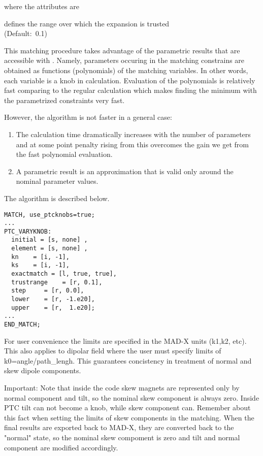 where the attributes are
\begin{madlist}
   defines the range over which the expansion is
  trusted \\ (Default:~0.1)
\end{madlist}

This matching procedure takes advantage of the parametric results that
are accessible with \ptc. Namely, parameters occuring in the matching
constrains are obtained as functions (polynomials) of the matching
variables. In other words, each variable is a knob in \ptc
calculation. Evaluation of the polynomials is relatively fast comparing
to the regular \ptc calculation which makes finding the minimum with the
parametrized constraints very fast.  

However, the algorithm is not faster in a general case: 
\begin{enumerate}
   \item  The calculation time dramatically increases with the number of
     parameters and at some point penalty rising from this overcomes the
     gain we get from the fast polynomial evaluation.    
   \item  A parametric result is an approximation that is valid only
     around the nominal parameter values.     
\end{enumerate}

The algorithm is described below. \\
 
\begin{verbatim}
MATCH, use_ptcknobs=true;
...
PTC_VARYKNOB: 
  initial = [s, none] , 
  element = [s, none] , 
  kn    = [i, -1], 
  ks    = [i, -1], 
  exactmatch = [l, true, true], 
  trustrange    = [r, 0.1],  
  step     = [r, 0.0], 
  lower    = [r, -1.e20],
  upper    = [r,  1.e20]; 
...
END_MATCH;
\end{verbatim}

For user convenience the limits are specified in the MAD-X units (k1,k2,
etc). This also applies to dipolar field where the user must specify
limits of k0=angle/path\_lengh. This guarantees concistency in
treatment of normal and skew dipole components.   

Important: Note that inside the code skew magnets are represented only
by  normal component and tilt, so the nominal skew component is always
zero.  Inside PTC tilt can not become a knob, while skew component can.
Remember about this fact when setting the limits of skew components in
the matching.  When the final results are exported back to MAD-X, they
are converted back to the "normal" state, so the nominal skew compoment
is zero and tilt and  normal component are modified accordingly.     





